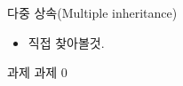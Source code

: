 \documentclass[10pt]{beamer}
\begin{document}

\begin{frame}{다중 상속(Multiple inheritance)}
    \begin{itemize}
        \item 직접 찾아볼것.
    \end{itemize}    
\end{frame}    



\begin{frame}{과제}
    과제 0
\end{frame}    
\end{document}
